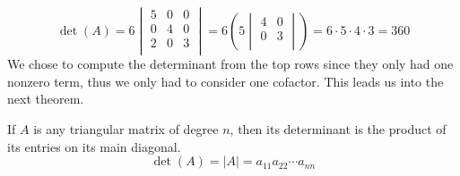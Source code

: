 \[
    \det(A)=6\begin{vmatrix}
         5&0  &0   \\
         0&4  &0   \\
         2&0  &3   \\
    \end{vmatrix}=6\left(5\begin{vmatrix}
         4&0   \\
         0&3   \\
    \end{vmatrix}\right)=6\cdot5\cdot4\cdot3=360
\]
We chose to compute the determinant from the top rows since they only had one nonzero term, thus we only had to consider one cofactor. This leads us into the next theorem.
\begin{theorem}
    If \(A\) is any triangular matrix of degree \(n\), then its determinant is the product of its entries on its main diagonal.
    \[
        \det(A)=|A| =a_{11}a_{22}\cdots a_{nn}   
    \]
\end{theorem}
 